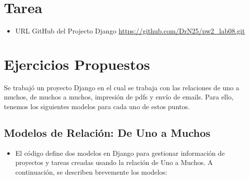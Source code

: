 \documentclass{article}
\begin{document}
	\section{Tarea}
	
\begin{itemize}
    \item URL GitHub del Projecto Django \url{https://github.com/DrN25/pw2\_lab08.git} 
            
\end{itemize}


\section{Ejercicios Propuestos}
Se trabajó un proyecto Django en el cual se trabaja con las relaciones de uno a muchos, de muchos a muchos, impresión de pdfs y envío de emails. Para ello, tenemos los siguientes modelos para cada uno de estos puntos. 

  
\subsection{Modelos de Relación: De Uno a Muchos}
\begin{itemize}
    \item El código define dos modelos en Django para gestionar información de proyectos y tareas creadas usando la relación de Uno a Muchos. A continuación, se describen brevemente los modelos:
\end{itemize}
\end{document}
